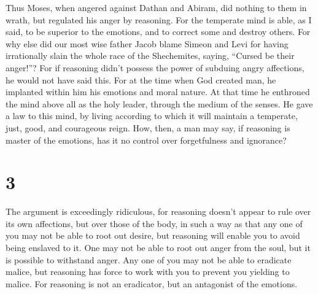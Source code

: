  Thus Moses, when angered against Dathan and Abiram, did
nothing to them in wrath, but regulated his anger by reasoning.
 For the temperate mind is able, as I said, to be
superior to the emotions, and to correct some and destroy others.
 For why else did our most wise father Jacob blame Simeon
and Levi for having irrationally slain the whole race of the
Shechemites, saying, ``Cursed be their anger!''?  For if
reasoning didn't possess the power of subduing angry affections, he
would not have said this.  For at the time when God
created man, he implanted within him his emotions and moral nature.
 At that time he enthroned the mind above all as the holy
leader, through the medium of the senses.  He gave a law
to this mind, by living according to which it will maintain a temperate,
just, good, and courageous reign.  How, then, a man may
say, if reasoning is master of the emotions, has it no control over
forgetfulness and ignorance?

\hypertarget{section-2}{%
\section{3}\label{section-2}}

 The argument is exceedingly ridiculous, for reasoning
doesn't appear to rule over its own affections, but over those of the
body,  in such a way as that any one of you may not be
able to root out desire, but reasoning will enable you to avoid being
enslaved to it.  One may not be able to root out anger
from the soul, but it is possible to withstand anger.  Any
one of you may not be able to eradicate malice, but reasoning has force
to work with you to prevent you yielding to malice.  For
reasoning is not an eradicator, but an antagonist of the emotions.

